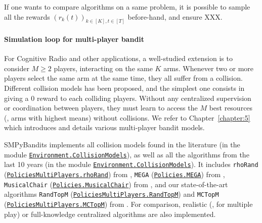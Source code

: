 If one wants to compare algorithms on a same problem, it is possible to sample all the rewards $(r_k(t))_{k\in[K], t\in[T]}$ before-hand, and ensure XXX.


\paragraph{Simulation loop for multi-player bandit}

For Cognitive Radio and other applications, a well-studied extension is to consider $M\geq2$ players, interacting on the same $K$ arms.
Whenever two or more players select the same arm at the same time, they all suffer from a collision.
%
Different collision models has been proposed, and the simplest one consists in giving a $0$ reward to each colliding players.
Without any centralized supervision or coordination between players, they must learn to access the $M$ best resources (\ie, arms with highest means) without collisions.
We refer to Chapter~\ref{chapter:5} which introduces and details various multi-player bandit models.

SMPyBandits implements all collision models found in the literature (in the module \texttt{\href{https://SMPyBandits.GitHub.io/docs/Environment.CollisionModels.html}{Environment.CollisionModels}}), as well as all the algorithms from the last 10 years (in the module \texttt{\href{https://SMPyBandits.GitHub.io/docs/Environment.CollisionModels.html}{Environment.CollisionModels}}).
%
It includes
\texttt{rhoRand} (\texttt{\href{https://SMPyBandits.GitHub.io/docs/PoliciesMultiPlayers.rhoRand.html}{PoliciesMultiPlayers.rhoRand}}) from \cite{Anandkumar11},
\texttt{MEGA} (\texttt{\href{https://SMPyBandits.GitHub.io/docs/Policies.MEGA.html}{Policies.MEGA}}) from \cite{Avner15},
\texttt{MusicalChair} (\texttt{\href{https://SMPyBandits.GitHub.io/docs/Policies.MusicalChair.html}{Policies.MusicalChair}}) from \cite{Rosenski16},
and our state-of-the-art algorithms
\texttt{RandTopM} (\texttt{\href{https://SMPyBandits.GitHub.io/docs/PoliciesMultiPlayers.RandTopM.html}{PoliciesMultiPlayers.RandTopM}}) and
\texttt{MCTopM} (\texttt{\href{https://SMPyBandits.GitHub.io/docs/PoliciesMultiPlayers.MCTopM.html}{PoliciesMultiPlayers.MCTopM}}) from \cite{Besson2018ALT}.
For comparison, realistic (\eg, \UCB{} for multiple play) or full-knowledge centralized algorithms are also implemented.

